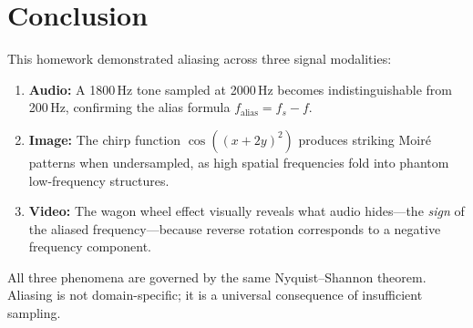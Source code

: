 \documentclass[12pt, a4paper]{article}
\begin{document}
\section{Conclusion}

This homework demonstrated aliasing across three signal modalities:

\begin{enumerate}
    \item \textbf{Audio:} A 1800\,Hz tone sampled at 2000\,Hz becomes indistinguishable from 200\,Hz, confirming the alias formula $f_{\text{alias}} = f_s - f$.
    \item \textbf{Image:} The chirp function $\cos((x+2y)^2)$ produces striking Moir\'{e} patterns when undersampled, as high spatial frequencies fold into phantom low-frequency structures.
    \item \textbf{Video:} The wagon wheel effect visually reveals what audio hides---the \emph{sign} of the aliased frequency---because reverse rotation corresponds to a negative frequency component.
\end{enumerate}

All three phenomena are governed by the same Nyquist--Shannon theorem. Aliasing is not domain-specific; it is a universal consequence of insufficient sampling.
\end{document}
